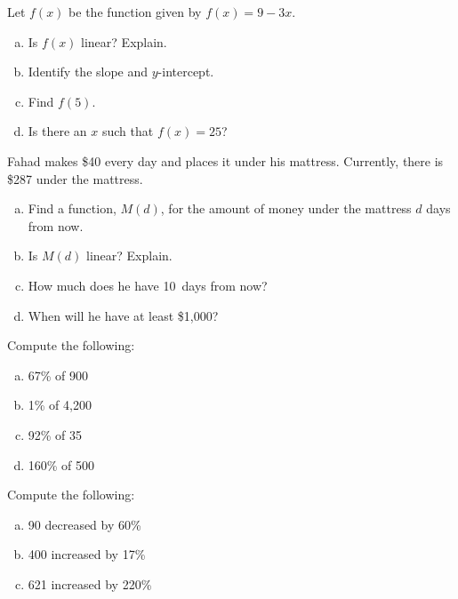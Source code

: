 \documentclass[11pt,letterpaper]{article}
\begin{document}

 Let $f(x)$ be the function given by $f(x)= 9 - 3x$.
	\begin{enumerate}[(a)]
	\item Is $f(x)$ linear? Explain.
	\item Identify the slope and $y$-intercept.
	\item Find $f(5)$.
	\item Is there an $x$ such that $f(x)= 25$?
	\end{enumerate} 

\vfill

 Fahad makes \$40 every day and places it under his mattress. Currently, there is \$287 under the mattress. 
	\begin{enumerate}[(a)]
	\item Find a function, $M(d)$, for the amount of money under the mattress $d$ days from now.
	\item Is $M(d)$ linear? Explain. 
	\item How much does he have 10~days from now?
	\item When will he have at least \$1,000?
	\end{enumerate}

\vfill



\newpage


 Compute the following:
	\begin{enumerate}[(a)]
	\item 67\% of 900
	\item 1\% of 4,200
	\item 92\% of 35
	\item 160\% of 500
	\end{enumerate} 


\vfill


 Compute the following: 
	\begin{enumerate}[(a)]
	\item 90 decreased by 60\%
	\item 400 increased by 17\%
	\item 621 increased by 220\%
	\end{enumerate} 

\vfill
\end{document}
